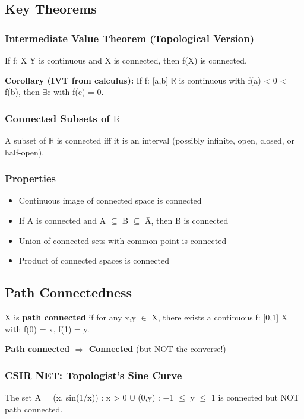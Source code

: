 \documentclass[12pt,a4paper,openany]{book}
\begin{document}
{{\subsection{Key Theorems }

\subsubsection{Intermediate Value Theorem (Topological Version)}
If f: X  Y is continuous and X is connected, then f(X) is connected.

\textbf{Corollary (IVT from calculus):} If f: [a,b]  $\mathbb{R}$ is continuous with f(a) < 0 < f(b), then $\exists$c with f(c) = 0.

\subsubsection{Connected Subsets of $\mathbb{R}$}
A subset of $\mathbb{R}$ is connected iff it is an interval (possibly infinite, open, closed, or half-open).

\subsubsection{Properties}
\begin{itemize}
  \item Continuous image of connected space is connected
  \item If A is connected and A $\subseteq$ B $\subseteq$ Ā, then B is connected
  \item Union of connected sets with common point is connected
  \item Product of connected spaces is connected
\end{itemize}

\subsection{Path Connectedness}
X is \textbf{path connected} if for any x,y $\in$ X, there exists a continuous f: [0,1]  X with f(0) = x, f(1) = y.

\textbf{Path connected $\Longrightarrow$ Connected} (but NOT the converse!)

\subsubsection{ CSIR NET: Topologist's Sine Curve}
The set A = {(x, sin(1/x)) : x > 0} $\cup$ {(0,y) : −1 $\leq$ y $\leq$ 1} is connected but NOT path connected.

}}
\end{document}
